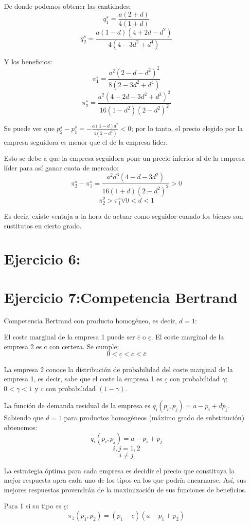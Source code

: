 \documentclass{article}
\theoremstyle{definition}
\theoremstyle{remark}
\begin{document}
De donde podemos obtener las cantidades:
$$q_1^s=\frac{a(2+d)}{4(1+d)}$$
$$q_2^s=\frac{a(1-d)(4+2d-d^2)}{4(4-3d^2+d^4)}$$

Y los beneficios:
$$\pi_1^s=\frac{a^2(2-d-d^2)^2}{8(2-3d^2+d^4)}$$
$$\pi_2^s=\frac{a^2(4-2d-3d^2+d^3)^2}{16(1-d^2)(2-d^2)^2}$$

Se puede ver que $p_2^s-p_1^s=-\frac{a(1-d)d^2}{4(2-d^2)}<0$; por lo tanto, el precio elegido por la empresa seguidora es menor que el de la empresa l\'ider.


Esto se debe a que la empresa seguidora pone un precio inferior al de la empresa l\'ider para as\'i ganar cuota de mercado:
$$\pi_2^s-\pi_1^s=\frac{a^2d^3(4-d-3d^2)}{16(1+d)(2-d^2)^2}>0$$
$$\pi_2^2>\pi_1^s   \forall   0<d<1$$

Es decir, existe ventaja a la hora de actuar como seguidor cuando los bienes son sustitutos en cierto grado.

\section{Ejercicio 6:}
\section{Ejercicio 7:Competencia Bertrand}

Competencia Bertrand con producto homog\'eneo, es decir, $d=1$:

El coste marginal de la empresa 1 puede ser $\bar{c}$ o $\underline{c}$.
El coste marginal de la empresa 2 es c con certeza.
Se cumple:
$$0<\underline{c}<c<\bar{c}$$

La empresa 2 conoce la distribuci\'on de probabilidad del coste marginal de la empresa 1, es decir, sabe que el coste la empresa 1 es $\underline{c}$ con probabilidad $\gamma$; $0<\gamma<1$ y $\bar{c}$ con probabilidad $(1-\gamma)$.

La funci\'on de demanda residual de la empresa es $q_i(p_i,p_j)=a-p_i+dp_j$. Sabiendo que $d=1$ para productos homog\'eneos (m\'aximo grado de substituci\'on) obtenemos:
$$q_i(p_i,p_j)=a-p_i+p_j$$ $$i,j=1,2$$ $$i\neq j$$

La estrategia \'optima para cada empresa es decidir el precio que constituya la mejor respuesta apra cada uno de los tipos  en los que podr\'ia encarnarse. As\'i, sus mejores respuestas provendr\'an de la maximizaci\'on de sus funciones de beneficios.

Para 1 si su tipo es $\underline{c}$:
$$\pi_1(p_1,p_2)=(p_1-\underline{c})(a-p_1+p_2)$$
\end{document}
